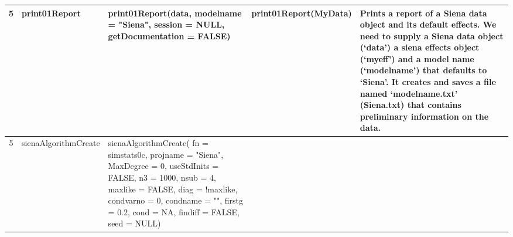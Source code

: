 \documentclass[a4paper,fleqn,11pt]{article}
\newcommand{\+}{\, + \,}
\begin{document}
\begin{landscape}
\begin{small}
\begin{longtable}{c | p{3.8cm} | p{4.5cm} | p{4.0cm} | p{7.4cm} }
5 & print01Report & print01Report(data, modelname = "Siena",\newline
session = NULL, \newline
getDocumentation = FALSE) & print01Report(MyData) & Prints a
report of a Siena data object and its default effects. We need to supply a
Siena data object (`data') a siena effects object (`myeff') and a model
name (`modelname') that defaults to `Siena'. It creates and saves a file
named `modelname.txt' (Siena.txt) that contains preliminary information
on the data.\\
\hline

5 & sienaAlgorithmCreate & sienaAlgorithmCreate(\newline
fn = simstats0c,\newline
projname = "Siena", \newline
MaxDegree = 0, \newline
useStdInits = FALSE, n3 = 1000, \newline
nsub = 4, maxlike = FALSE, \newline
diag = !maxlike, \newline
condvarno = 0, \newline
condname = "", firstg = 0.2, \newline
cond = NA, findiff = FALSE, \newline
seed = NULL) &



\end{longtable}
\end{small}
\end{landscape}
\end{document}
